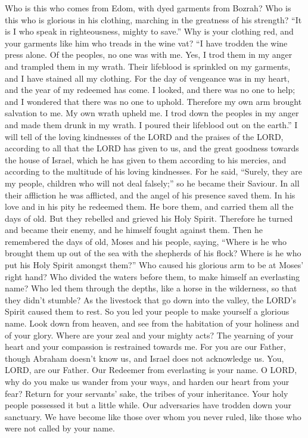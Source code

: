  Who is this who comes from Edom, with dyed garments from
Bozrah? Who is this who is glorious in his clothing, marching in the
greatness of his strength? ``It is I who speak in righteousness, mighty
to save.''  Why is your clothing red, and your garments
like him who treads in the wine vat?  ``I have trodden the
wine press alone. Of the peoples, no one was with me. Yes, I trod them
in my anger and trampled them in my wrath. Their lifeblood is sprinkled
on my garments, and I have stained all my clothing.  For
the day of vengeance was in my heart, and the year of my redeemed has
come.  I looked, and there was no one to help; and I
wondered that there was no one to uphold. Therefore my own arm brought
salvation to me. My own wrath upheld me.  I trod down the
peoples in my anger and made them drunk in my wrath. I poured their
lifeblood out on the earth.''  I will tell of the loving
kindnesses of the LORD and the praises of the LORD, according to all
that the LORD has given to us, and the great goodness towards the house
of Israel, which he has given to them according to his mercies, and
according to the multitude of his loving kindnesses.  For
he said, ``Surely, they are my people, children who will not deal
falsely;'' so he became their Saviour.  In all their
affliction he was afflicted, and the angel of his presence saved them.
In his love and in his pity he redeemed them. He bore them, and carried
them all the days of old.  But they rebelled and grieved
his Holy Spirit. Therefore he turned and became their enemy, and he
himself fought against them.  Then he remembered the days
of old, Moses and his people, saying, ``Where is he who brought them up
out of the sea with the shepherds of his flock? Where is he who put his
Holy Spirit amongst them?''  Who caused his glorious arm
to be at Moses' right hand? Who divided the waters before them, to make
himself an everlasting name?  Who led them through the
depths, like a horse in the wilderness, so that they didn't stumble?
 As the livestock that go down into the valley, the
LORD's Spirit caused them to rest. So you led your people to make
yourself a glorious name.  Look down from heaven, and see
from the habitation of your holiness and of your glory. Where are your
zeal and your mighty acts? The yearning of your heart and your
compassion is restrained towards me.  For you are our
Father, though Abraham doesn't know us, and Israel does not acknowledge
us. You, LORD, are our Father. Our Redeemer from everlasting is your
name.  O LORD, why do you make us wander from your ways,
and harden our heart from your fear? Return for your servants' sake, the
tribes of your inheritance.  Your holy people possessed
it but a little while. Our adversaries have trodden down your sanctuary.
 We have become like those over whom you never ruled,
like those who were not called by your name.

